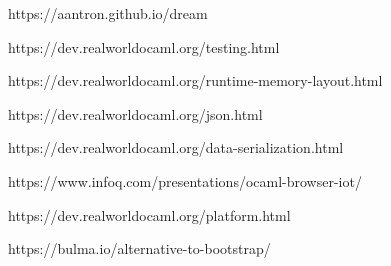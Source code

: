 \begin{thebibliography}{00}
    https://aantron.github.io/dream \TODO

    https://dev.realworldocaml.org/testing.html

    https://dev.realworldocaml.org/runtime-memory-layout.html \TODO

    https://dev.realworldocaml.org/json.html \TODO

    https://dev.realworldocaml.org/data-serialization.html \TODO

    https://www.infoq.com/presentations/ocaml-browser-iot/ \TODO

    https://dev.realworldocaml.org/platform.html \TODO

    https://bulma.io/alternative-to-bootstrap/ \TODO

\end{thebibliography}
\endgroup

